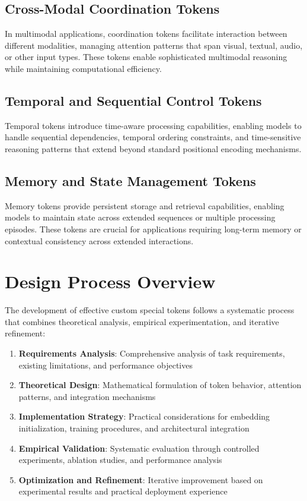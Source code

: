 \subsection{Cross-Modal Coordination Tokens}

In multimodal applications, coordination tokens facilitate interaction between different modalities, managing attention patterns that span visual, textual, audio, or other input types. These tokens enable sophisticated multimodal reasoning while maintaining computational efficiency.

\subsection{Temporal and Sequential Control Tokens}

Temporal tokens introduce time-aware processing capabilities, enabling models to handle sequential dependencies, temporal ordering constraints, and time-sensitive reasoning patterns that extend beyond standard positional encoding mechanisms.

\subsection{Memory and State Management Tokens}

Memory tokens provide persistent storage and retrieval capabilities, enabling models to maintain state across extended sequences or multiple processing episodes. These tokens are crucial for applications requiring long-term memory or contextual consistency across extended interactions.

\section{Design Process Overview}

The development of effective custom special tokens follows a systematic process that combines theoretical analysis, empirical experimentation, and iterative refinement:

\begin{enumerate}
\item \textbf{Requirements Analysis}: Comprehensive analysis of task requirements, existing limitations, and performance objectives
\item \textbf{Theoretical Design}: Mathematical formulation of token behavior, attention patterns, and integration mechanisms
\item \textbf{Implementation Strategy}: Practical considerations for embedding initialization, training procedures, and architectural integration
\item \textbf{Empirical Validation}: Systematic evaluation through controlled experiments, ablation studies, and performance analysis
\item \textbf{Optimization and Refinement}: Iterative improvement based on experimental results and practical deployment experience
\end{enumerate}

